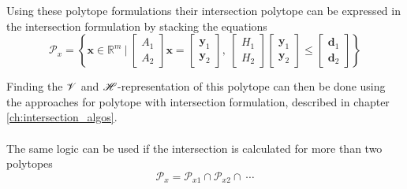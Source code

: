 Using these polytope formulations their intersection polytope can be expressed in the intersection formulation by stacking the equations
\begin{equation}
    \mathcal{P}_{x}=\left\{\bm{x}\in\mathbb{R}^m ~\bigg|~ 
   \begin{bmatrix}
        A_1 \\
        A_2
    \end{bmatrix} \bm{x} = \begin{bmatrix}
        \bm{y}_1 \\
        \bm{y}_2
    \end{bmatrix}, ~\begin{bmatrix}
        H_1  \\
        H_2
    \end{bmatrix} \begin{bmatrix}
        \bm{y}_1 \\
        \bm{y}_2
    \end{bmatrix} \leq \begin{bmatrix}
        \bm{d}_1  \\
        \bm{d}_2
    \end{bmatrix} \right\}
\end{equation}


Finding the $\mathscr{V}$ and $\mathscr{H}$-representation of this polytope can then be done using the approaches for polytope with intersection formulation, described in chapter \ref{ch:intersection_algos}.


\paragraph*{} The same logic can be used if the intersection is calculated for more than two polytopes 
\begin{equation}
    \mathcal{P}_x = \mathcal{P}_{x1} \cap \mathcal{P}_{x2} \cap ~\cdots
\end{equation}



